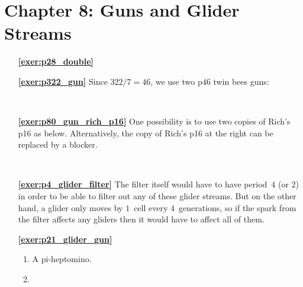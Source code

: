 \hypertarget{solutions_glider_guns}{}\label{solutions_glider_guns}
\section*{Chapter 8: Guns and Glider Streams}
\renewcommand{\chapterfolder}{glider_guns/}

\begin{multicols}{2}
	\begin{itemize}[leftmargin=0em]
		\item[\bf\color{ocre}\sffamily\ref{exer:p28_double}] \\
		
		
		\item[\bf\color{ocre}\sffamily\ref{exer:p322_gun}] Since $322/7 = 46$, we use two p$46$ twin bees guns:
		\begin{center}
			\\
		\end{center}
		
		
		\item[\bf\color{ocre}\sffamily\ref{exer:p80_gun_rich_p16}] One possibility is to use two copies of Rich's p16 as below. Alternatively, the copy of Rich's p16 at the right can be replaced by a blocker.
		\begin{center}
			\\
		\end{center}
		
		
		\item[\bf\color{ocre}\sffamily\ref{exer:p4_glider_filter}] The filter itself would have to have period~$4$ (or $2$) in order to be able to filter out any of these glider streams. But on the other hand, a glider only moves by $1$~cell every $4$~generations, so if the spark from the filter affects any gliders then it would have to affect all of them.\\
		
		
		\item[\bf\color{ocre}\sffamily\ref{exer:p21_glider_gun}] \begin{enumerate}[leftmargin=1.5em,label=\bf\color{ocre}(\alph*)]
			\item A pi-heptomino.
			
			\item {} \\
			

\end{enumerate}
\end{itemize}
\end{multicols}
